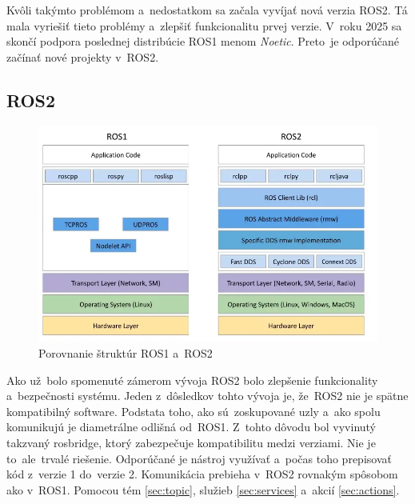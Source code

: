 Kvôli takýmto problémom a~nedostatkom sa začala vyvíjať nová verzia ROS2. Tá mala vyriešiť tieto problémy a~zlepšiť funkcionalitu
prvej verzie. V~roku 2025 sa skončí podpora poslednej distribúcie ROS1 menom \textit{Noetic}. Preto~je odporúčané začínať nové projekty
v~ROS2.

\subsection{ROS2}
\label{subsec:ros2}

\begin{figure}[!htbp]
	\centering
	\includegraphics[width=15cm]{img/strukturaRos1Ros2.png}
	\caption{Porovnanie štruktúr ROS1 a~ROS2~\cite{comparison}}
	\label{fig:struktury}
\end{figure}

Ako už~bolo spomenuté zámerom vývoja ROS2 bolo zlepšenie funkcionality a~bezpečnosti systému. Jeden z~dôsledkov tohto vývoja je, že~ROS2
nie je spätne kompatibilný software. Podstata toho, ako sú~zoskupované uzly a~ako spolu komunikujú je diametrálne odlišná od~ROS1. Z~tohto dôvodu
bol vyvinutý takzvaný rosbridge, ktorý zabezpečuje kompatibilitu medzi verziami. Nie je to~ale~trvalé riešenie. Odporúčané je nástroj
využívať a~počas toho prepisovať kód z~verzie 1 do~verzie 2. Komunikácia prebieha v~ROS2 rovnakým spôsobom ako v~ROS1. Pomocou tém
\ref{sec:topic}, služieb \ref{sec:services} a~akcií \ref{sec:actions}.

